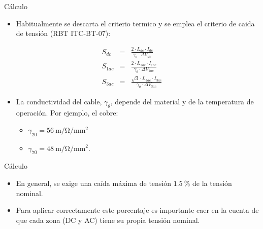 \documentclass[xcolor={usenames,svgnames,dvipsnames}]{beamer}
\begin{document}
\begin{frame}[label={sec:orge708ba9}]{Cálculo}
\begin{itemize}
\item Habitualmente se descarta el criterio termico y se emplea el criterio de caida de tensión (RBT ITC-BT-07):
\end{itemize}

\[
  \begin{aligned}
    S_{dc} & = & \frac{2 \cdot L_{dc}\cdot I_{dc}}{\gamma_\theta \cdot \Delta V_{dc}}\\
    S_{1ac} & = & \frac{2\cdot L_{1ac}\cdot I_{1ac}}{\gamma_\theta \cdot \Delta V_{1ac}}\\
    S_{3ac} & = & \frac{\sqrt{3} \cdot L_{3ac}\cdot I_{3ac}}{\gamma_\theta \cdot \Delta V_{3ac}}
  \end{aligned}
\]

\begin{itemize}
\item La conductividad del cable, \(\gamma_\theta\), depende del material y de la
temperatura de operación. Por ejemplo, el cobre:
\begin{itemize}
\item \(\gamma_{20} =\SI{56}{\meter\per\ohm\per\milli\meter\squared}\)
\item \(\gamma_{70} = \SI{48}{\meter\per\ohm\per\milli\meter\squared}\).
\end{itemize}
\end{itemize}
\end{frame}

\begin{frame}[label={sec:org79eb24b}]{Cálculo}
\begin{itemize}
\item En general, se exige una caída máxima de tensión
\(\SI{1.5}{\percent}\) de la tensión nominal.

\item Para aplicar correctamente este porcentaje es importante caer en la
cuenta de que \alert{cada zona (DC y AC) tiene su propia tensión nominal}.
\end{itemize}
\end{frame}
\end{document}
